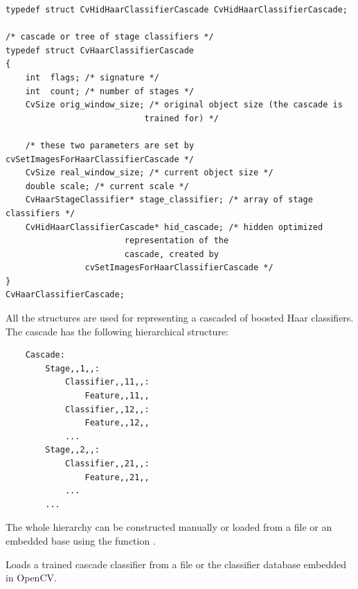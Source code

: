\begin{lstlisting}
typedef struct CvHidHaarClassifierCascade CvHidHaarClassifierCascade;

/* cascade or tree of stage classifiers */
typedef struct CvHaarClassifierCascade
{
    int  flags; /* signature */
    int  count; /* number of stages */
    CvSize orig_window_size; /* original object size (the cascade is 
                            trained for) */

    /* these two parameters are set by cvSetImagesForHaarClassifierCascade */
    CvSize real_window_size; /* current object size */
    double scale; /* current scale */
    CvHaarStageClassifier* stage_classifier; /* array of stage classifiers */
    CvHidHaarClassifierCascade* hid_cascade; /* hidden optimized 
                        representation of the 
                        cascade, created by 
                cvSetImagesForHaarClassifierCascade */
}
CvHaarClassifierCascade;
\end{lstlisting}

All the structures are used for representing a cascaded of boosted Haar classifiers. The cascade has the following hierarchical structure:

\begin{verbatim}
    Cascade:
        Stage,,1,,:
            Classifier,,11,,:
                Feature,,11,,
            Classifier,,12,,:
                Feature,,12,,
            ...
        Stage,,2,,:
            Classifier,,21,,:
                Feature,,21,,
            ...
        ...
\end{verbatim}

The whole hierarchy can be constructed manually or loaded from a file or an embedded base using the function .

Loads a trained cascade classifier from a file or the classifier database embedded in OpenCV.


\begin{description}
\end{description}

